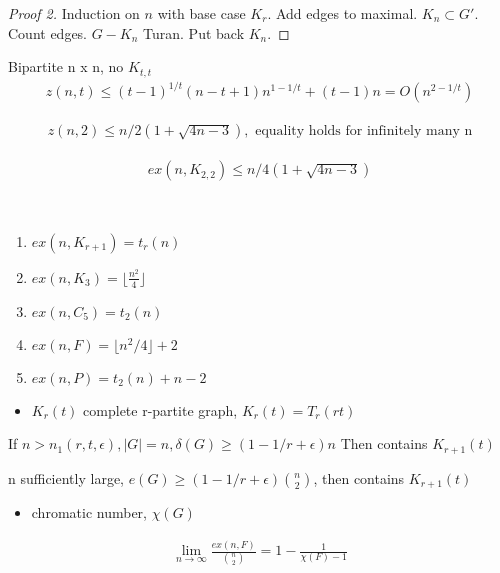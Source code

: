 \begin{proof}[Proof 2]
    Induction on $n$ with base case $K_r$.
    Add edges to maximal. $K_n \subset G'$.
    Count edges.
    $G - K_n$ Turan.
    Put back $K_n$.
\end{proof}

\begin{thm}
    Bipartite n x n, no $K_{t,t}$
    \begin{align*}
        z(n, t) \leq (t - 1)^{1/t}(n - t + 1)n^{1 - 1/t} + (t - 1)n = O(n^{2 - 1/t})
    \end{align*}
\end{thm}

\begin{thm}
    \begin{align*}
        z(n, 2) \leq n/2 (1 + \sqrt{4n - 3}), \text{ equality holds for infinitely many n}
    \end{align*}
\end{thm}

\begin{thm}
\begin{align*}
    ex(n, K_{2,2}) \leq n/4 (1 + \sqrt{4n - 3})
\end{align*}
\end{thm}

\begin{fact}
    \,
    \begin{enumerate}
        \item $ex(n, K_{r+1}) = t_r(n)$
        \item $ex(n, K_3) = \lfloor\frac{n^2}{4}\rfloor$
        \item $ex(n, C_5) = t_2(n)$
        \item $ex(n, F) = \lfloor n^2 / 4\rfloor + 2$
        \item $ex(n, P) = t_2(n) + n - 2$
    \end{enumerate}
\end{fact}

\begin{itemize}
    \item $K_r(t)$ complete r-partite graph, $K_r(t) = T_r(rt)$
\end{itemize}

\begin{lemma}
    If $n > n_1(r, t, \epsilon), |G| = n, \delta(G) \geq (1 - 1/r + \epsilon)n $
    Then contains $K_{r+1}(t)$
\end{lemma}

\begin{thm}
    n sufficiently large, $e(G) \geq (1 - 1/r + \epsilon) {n\choose2}$, then contains $K_{r+1}(t)$
\end{thm}

\begin{itemize}
    \item chromatic number, $\chi(G)$
\end{itemize}

\begin{cor}
    \begin{align*}
        \lim_{n \rightarrow \infty} \frac{ex(n, F)}{{n\choose 2}} = 1 -  \frac{1}{\chi(F) - 1}
    \end{align*}
\end{cor}
